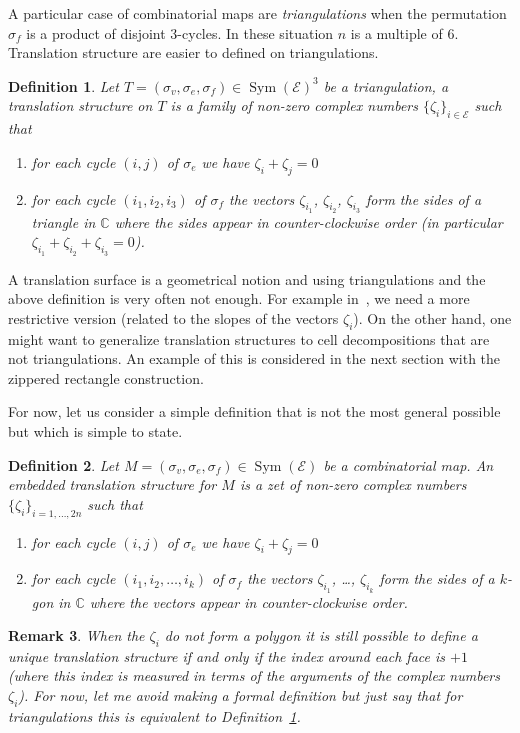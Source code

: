 \documentclass{article}
\def\CC{\mathbb{C}}
\def\cE{\mathcal{E}}
\def\Sym{\operatorname{Sym}}
\newtheorem{definition}{Definition}
\newtheorem{remark}[definition]{Remark}
\begin{document}
A particular case of combinatorial maps are \emph{triangulations}
when the permutation $\sigma_f$ is a product of disjoint 3-cycles.
In these situation $n$ is a multiple of $6$. Translation structure are
easier to defined on triangulations.
\begin{definition}
\label{def:FlatTriangulation}
Let $T = (\sigma_v, \sigma_e, \sigma_f) \in \Sym(\cE)^3$ be a 
triangulation, a \emph{translation structure} on $T$
is a family of non-zero complex numbers $\{\zeta_i\}_{i\in\cE}$
such that
\begin{enumerate}
\item for each cycle $(i,j)$ of $\sigma_e$ we have $\zeta_i + \zeta_j = 0$
\item for each cycle $(i_1,i_2,i_3)$ of $\sigma_f$ 
the vectors $\zeta_{i_1}$, $\zeta_{i_2}$, $\zeta_{i_3}$ form the
sides of a triangle in $\CC$ where the sides appear in counter-clockwise order
(in particular $\zeta_{i_1} + \zeta_{i_2} + \zeta_{i_3} = 0$).
\end{enumerate}
\end{definition}
A translation surface is a geometrical notion and using triangulations
and the above definition is very often not enough.
For example in~\cite{veerer}, we need a more restrictive version
(related to the slopes of the vectors $\zeta_i$).
On the other hand, one might want to generalize translation structures
to cell decompositions that are not triangulations. An example of
this is considered in the next section with the zippered rectangle
construction.

For now, let us consider a simple definition that is not the most
general possible but which is simple to state.
\begin{definition}
\label{def:EmbeddedTranslationStructure}
Let $M = (\sigma_v, \sigma_e, \sigma_f) \in \Sym(\cE)$ be a combinatorial
map. An \emph{embedded translation structure} for $M$ is a zet of non-zero
complex numbers $\{\zeta_i\}_{i=1,\ldots,2n}$ such that
\begin{enumerate}
\item for each cycle $(i,j)$ of $\sigma_e$ we have
$\zeta_i + \zeta_j = 0$
\item for each cycle $(i_1,i_2,\ldots,i_k)$ of $\sigma_f$ the vectors
$\zeta_{i_1}$, \ldots, $\zeta_{i_k}$ form the sides of a $k$-gon in
$\CC$ where the vectors appear in counter-clockwise order.
\end{enumerate}
\end{definition}

\begin{remark}
When the $\zeta_i$ do not form a polygon it is still
possible to define a unique translation structure if and
only if the index around each face is $+1$ (where this index is measured in terms
of the arguments of the complex numbers $\zeta_i$). For now, let me avoid making
a formal definition but just say that for triangulations
this is equivalent to Definition~\ref{def:FlatTriangulation}.
\end{remark}
\end{document}
